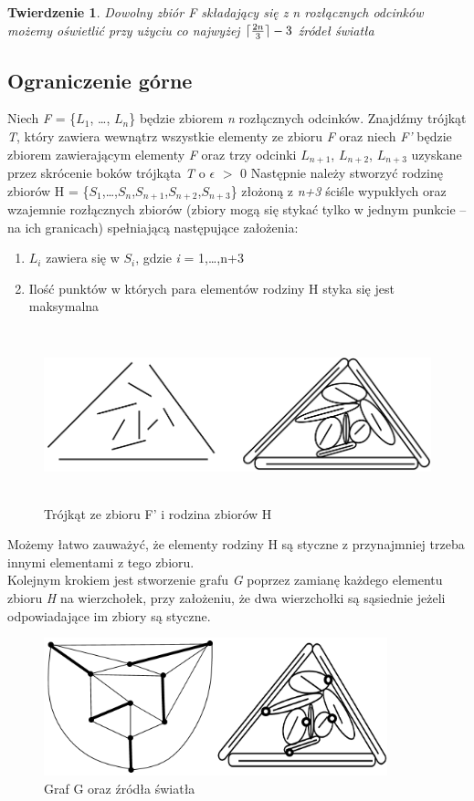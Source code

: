 \documentclass[brudnopis]{xmgr}
\DeclarePairedDelimiter\ceil{\lceil}{\rceil}
\newtheorem{Twierdzenie}{Twierdzenie}
\begin{document}
\begin{Twierdzenie}
 Dowolny zbiór F składający się z n rozłącznych odcinków możemy oświetlić przy użyciu co najwyżej $\ceil{\frac{2n}{3}} - 3$ źródeł światła
\end{Twierdzenie}
\subsection{Ograniczenie górne}
\indent Niech \textit{F} = \{$L_1$, \ldots, $L_n$\} będzie zbiorem \textit{n} rozłącznych odcinków. Znajdźmy trójkąt \textit{T}, który zawiera wewnątrz wszystkie elementy ze zbioru \textit{F} oraz niech \textit{F'} będzie zbiorem zawierającym elementy \textit{F} oraz trzy odcinki $L_{n+1}$, $L_{n+2}$, $L_{n+3}$ uzyskane przez skrócenie boków trójkąta \textit{T} o $\epsilon$ $>$ 0
Następnie należy stworzyć rodzinę zbiorów H = \{$S_1$,\ldots,$S_n$,$S_{n+1}$,$S_{n+2}$,$S_{n+3}$\} złożoną z \textit{n+3} ściśle wypukłych oraz wzajemnie rozłącznych zbiorów (zbiory mogą się stykać tylko w jednym punkcie -- na ich granicach) spełniającą następujące założenia:
\begin{enumerate}
  \item $L_i$ zawiera się w $S_i$, gdzie \textit{i} = 1,\ldots,n+3
  \item Ilość punktów w których para elementów rodziny H styka się jest maksymalna
\end{enumerate}
\begin{figure}[ht!]
 \centering
  \includegraphics[height=5cm, width=13.5cm]{rysunki/podswietlenie.png}
  \caption{Trójkąt ze zbioru F' i rodzina zbiorów H}
\end{figure} 
Możemy łatwo zauważyć, że elementy rodziny H są styczne z przynajmniej trzeba innymi elementami z tego zbioru. 
\\Kolejnym krokiem jest stworzenie grafu \textit{G} poprzez zamianę każdego elementu zbioru \textit{H} na wierzchołek, przy założeniu, że dwa wierzchołki są sąsiednie jeżeli odpowiadające im zbiory są styczne.
\begin{figure}[ht!]
 \centering
  \includegraphics[height=4cm]{rysunki/skojarzenia_zrodla_swiatla.png}
  \caption{Graf G oraz źródła światła}
\end{figure}
\end{document}
